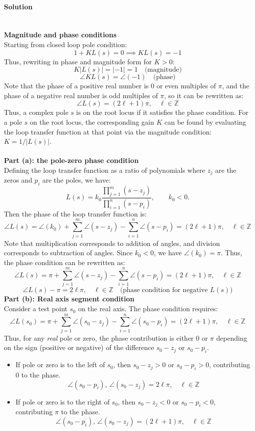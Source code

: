 \documentclass[11pt]{article}
\begin{document}
\paragraph{Solution}\mbox{}\\
\textbf{Magnitude and phase conditions}\\
Starting from closed loop pole condition:
\[1+ K L(s) = 0 \implies K L(s) = -1\]
Thus, rewriting in phase and magnitude form for $K>0$:
\[K|L(s)| = |-1|=1 \quad \text{(magnitude)}\]
\[\angle KL(s) = \angle(-1) \quad \text{(phase)}\]
Note that the phase of a positive real number is $0$ or even multiples of $\pi$, and the phase of a negative real number is odd multiples of $\pi$, so it can be rewritten as:
\[\angle L(s) = (2\ell +1)\pi,\quad \ell\in\mathbb{Z}\]
Thus, a complex pole \(s\) is on the root locus if it satisfies the phase condition. For a pole \(s\) on the root locus, the corresponding gain \(K\) can be found by evaluating the loop transfer function at that point via the magnitude condition: $K = 1/|L(s)|$.\\\\
\textbf{Part (a): the pole-zero phase condition}\\
Defining the loop transfer function as a ratio of polynomials where $z_j$ are the zeros and $p_i$ are the poles, we have:
\[
L(s)=k_0\frac{\displaystyle\prod_{j=1}^{m}(s-z_j)}{\displaystyle\prod_{i=1}^{n}(s-p_i)}, \qquad k_0<0.
\]
Then the phase of the loop transfer function is:
\[\angle L(s) = \angle(k_0) + \sum_{j=1}^m \angle(s-z_j) - \sum_{i=1}^n \angle(s-p_i) = (2\ell +1)\pi,\quad \ell\in\mathbb{Z}\]
Note that multiplication corresponds to addition of angles, and division corresponds to subtraction of angles. Since $k_0<0$, we have $\angle(k_0) = \pi$. Thus, the phase condition can be rewritten as:
\[\angle L(s) = \pi + \sum_{j=1}^m \angle(s-z_j) - \sum_{i=1}^n \angle(s-p_i) = (2\ell +1)\pi,\quad \ell\in\mathbb{Z}\]
\[\boxed{\angle L(s) - \pi =  2\ell\pi,\quad \ell\in\mathbb{Z}\quad \text{(phase condition for negative $L(s)$)}}\]
\textbf{Part (b): Real axis segment condition}\\
Consider a test point $s_0$ on the real axis. The phase condition requires:
\[\angle L(s_0) = \pi + \sum_{j=1}^m \angle(s_0-z_j) - \sum_{i=1}^n \angle(s_0-p_i) = (2\ell+1)\pi,\quad \ell\in\mathbb{Z}\]
Thus, for any \textit{real} pole or zero, the phase contribution is either $0$ or $\pi$ depending on the sign (positive or negative) of the difference $s_0 - z_j$ or $s_0 - p_i$. 
\begin{itemize}
    \item If pole or zero is to the left of $s_0$, then $s_0 - z_j > 0$ or $s_0 - p_i > 0$, contributing $0$ to the phase.
    \[\angle (s_0 - p_i),\,\angle (s_0 - z_j) = 2\ell \pi,\quad \ell\in\mathbb{Z}\]
    \item If pole or zero is to the right of $s_0$, then $s_0 - z_j < 0$ or $s_0 - p_i < 0$, contributing $\pi$ to the phase.
    \[\angle (s_0 - p_i),\,\angle (s_0 - z_j) = (2\ell +1)\pi,\quad \ell\in\mathbb{Z}\]
\end{itemize}
\end{document}
